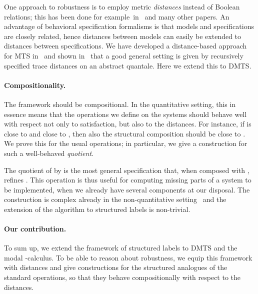 \documentclass[twocolumn]{svjour3-dummy}
\begin{document}
One approach to robustness is to employ metric \emph{distances} instead
of Boolean relations; this has been done for example~in~\cite{DBLP:journals/tse/AlfaroFS09,
  DBLP:conf/mfcs/LarsenMP12, DBLP:journals/tcs/DesharnaisGJP04,
  DBLP:journals/tcs/BreugelW05, DBLP:conf/formats/HenzingerMP05,
  DBLP:journals/tcs/CernyHR12, DBLP:conf/forte/Romero-HernandezF12,
  DBLP:conf/wadt/Romero-HernandezF12, DBLP:journals/tcs/AlfaroFHMS05,
  DBLP:conf/concur/Alfaro03 } and many other papers.  An advantage of
behavioral specification formalisms is that models and specifications
are closely related, hence distances between models can easily be
extended to distances between specifications.  We have developed a
distance-based approach for MTS in~\cite{
  DBLP:conf/csr/BauerFLT12,
  DBLP:conf/mfcs/BauerFJLLT11,
  DBLP:journals/acta/FahrenbergL14, DBLP:journals/fmsd/BauerFJLLT13} and
shown in~\cite{DBLP:journals/tcs/FahrenbergL14,
  DBLP:journals/acta/FahrenbergL14,
  DBLP:conf/csr/BauerFLT12,
  DBLP:conf/fsttcs/FahrenbergLT11,
  DBLP:conf/aplas/FahrenbergL13} that a good general setting is given by
recursively specified trace distances on an abstract quantale.  Here we
extend this to DMTS.

\paragraph{Compositionality.}
The framework should be compositional. In the quantitative setting, this
in essence means that the operations we define on the systems should
behave well with respect not only to satisfaction, but also to the
distances. For instance, if  is close to  and  close to
, then also the structural composition  should be close
to . We prove this for the usual operations; in particular,
we give a construction for such a well-behaved
\emph{quotient}.

The quotient of  by  is the most general specification that, when
composed with , refines . This operation is thus useful for
computing missing parts of a system to be implemented, when we already
have several components at our disposal. The construction is complex
already in the non-quantitative
setting~\cite{DBLP:conf/concur/BenesDFKL13} and the extension of the
algorithm to structured labels is non-trivial.

\paragraph{Our contribution.}
To sum up, we extend the framework of structured labels to DMTS and
the modal -calculus.  To be able to reason about robustness, we
equip this framework with distances and give constructions for the
structured analogues of the standard operations, so that they behave
compositionally with respect to the distances.
\end{document}
